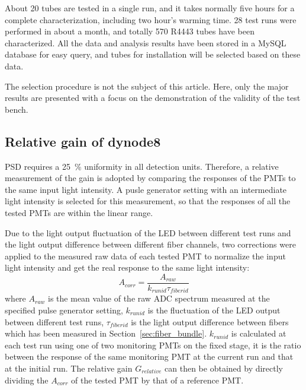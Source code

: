 \documentclass{nst}
\begin{document}
About 20 tubes are tested in a single run, and it takes normally five hours for a complete characterization, including two hour's warming time. 
28 test runs were performed in about a month, and totally 570 R4443 tubes have been characterized. 
All the data and analysis results have been stored in a MySQL database for easy query, and tubes for installation will be selected based on these data.

The selection procedure is not the subject of this article.
Here, only the major results are presented with a focus on the demonstration of the validity of the test bench. 

\subsection{Relative gain of dynode8}
\label{sec:psd_gain}

PSD requires a \SI{25}{\percent} uniformity in all detection units. 
Therefore, a relative measurement of the gain is adopted by comparing the responses of the PMTs to the same input light intensity.
A pusle generator setting with an intermediate light intensity is selected for this measurement, so that the responses of all the tested PMTs are within the linear range.


Due to the light output fluctuation of the LED between different test runs and the light output difference between different fiber channels, two corrections were applied to the measured raw data of each tested PMT to normalize the input light intensity and get the real response to the same light intensity: 
\begin{equation}
	A_{corr} = \frac{A_{raw}}{k_{runid}\tau_{fiberid}}
\end{equation} 
where $A_{raw}$ is the mean value of the raw ADC spectrum measured at the specified pulse generator setting,
$k_{runid}$ is the fluctuation of the LED output between different test runs,
$\tau_{fiberid}$ is the light output difference between fibers which has been measured in Section~\ref{sec:fiber_bundle}.
$k_{runid}$ is calculated at each test run using one of two monitoring PMTs on the fixed stage, it is the ratio between the response of the same monitoring PMT at the current run and that at the initial run.
The relative gain $G_{relative}$ can then be obtained by directly dividing the $A_{corr}$ of the tested PMT by that of a reference PMT.
\end{document}
